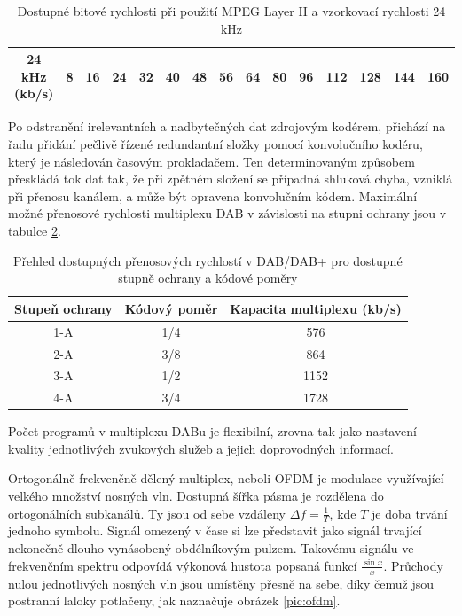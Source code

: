 \begin{table}[h]
\centering
\begin{tabular}{|c|c|c|c|c|c|c|c|c|c|c|c|c|c|c|}
\hline
24 kHz (kb/s) & 8 & 16 & 24 & 32 & 40 & 48 & 56 & 64 & 80 & 96 & 112 & 128 & 144 & 160 \\ \hline
\end{tabular}
\caption{Dostupné bitové rychlosti při použití MPEG Layer II a vzorkovací rychlosti 24 kHz \cite{etsi:mp2}}
\label{table:dabbitrates2}
\end{table}


Po odstranění irelevantních a nadbytečných dat zdrojovým kodérem, přichází na řadu přidání pečlivě řízené redundantní složky pomocí konvolučního kodéru, který je následován časovým prokladačem. Ten determinovaným způsobem přeskládá tok dat tak, že při zpětném složení se případná shluková chyba, vzniklá při přenosu kanálem,  a může být opravena konvolučním kódem. Maximální možné přenosové rychlosti multiplexu DAB v závislosti na stupni ochrany jsou v tabulce \ref{table:dabcoderates}.

\begin{table}[h]
\centering
\begin{tabular}{|c|c|c|}
\hline
Stupeň ochrany & Kódový poměr & Kapacita multiplexu (kb/s) \\ \hline
1-A & 1/4 & 576 \\ \hline
2-A & 3/8 & 864 \\ \hline
3-A & 1/2 & 1152 \\ \hline
4-A & 3/4 & 1728 \\ \hline
\end{tabular}
\caption{Přehled dostupných přenosových rychlostí v DAB/DAB+ pro dostupné stupně ochrany a kódové poměry}
\label{table:dabcoderates}
\end{table}

Počet programů v multiplexu DABu je flexibilní, zrovna tak jako nastavení kvality jednotlivých zvukových služeb a jejich doprovodných informací.

Ortogonálně frekvenčně dělený multiplex, neboli OFDM je modulace využívající velkého množství nosných vln. Dostupná šířka pásma je rozdělena do ortogonálních subkanálů. Ty jsou od sebe vzdáleny $\Delta f = \frac{1}{T}$, kde $T$ je doba trvání jednoho symbolu. Signál omezený v čase si lze představit jako signál trvající nekonečně dlouho vynásobený obdélníkovým pulzem. Takovému signálu ve frekvenčním spektru odpovídá výkonová hustota popsaná funkcí $\frac{\sin{x}}{x}$. Průchody nulou jednotlivých nosných vln jsou umístěny přesně na sebe, díky čemuž jsou postranní laloky potlačeny, jak naznačuje obrázek \ref{pic:ofdm}.

